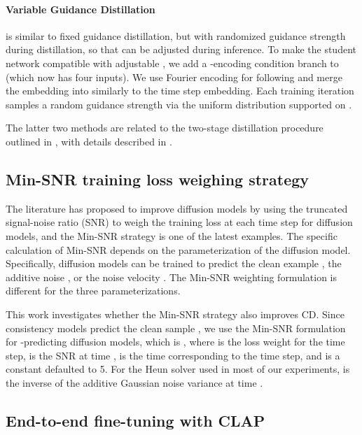 \documentclass{article}
\begin{document}
\vspace{-11pt}
\paragraph*{Variable Guidance Distillation} is similar to fixed guidance distillation, but with randomized guidance strength  during distillation, so that  can be adjusted during inference. To make the student network compatible with adjustable , we add a -encoding condition branch to  (which now has four inputs). We use Fourier encoding for  following \cite{distillcfg} and merge the embedding into  similarly to the time step embedding. Each training iteration samples a random guidance strength  via the uniform distribution supported on .

The latter two methods are related to the two-stage distillation procedure outlined in \cite{distillcfg}, with details described in .


\subsection{Min-SNR training loss weighing strategy}

The literature has proposed to improve diffusion models by using the truncated signal-noise ratio (SNR) to weigh the training loss at each time step  for diffusion models, and the Min-SNR strategy \cite{minsnr} is one of the latest examples. The specific calculation of Min-SNR depends on the parameterization of the diffusion model. Specifically, diffusion models can be trained to predict the clean example , the additive noise , or the noise velocity . The Min-SNR weighting formulation is different for the three parameterizations.

This work investigates whether the Min-SNR strategy also improves CD. Since consistency models predict the clean sample , we use the Min-SNR formulation for -predicting diffusion models, which is , where  is the loss weight for the  time step,  is the SNR at time ,  is the time corresponding to the  time step, and  is a constant defaulted to 5. For the Heun solver used in most of our experiments,  is the inverse of the additive Gaussian noise variance at time .


\subsection{End-to-end fine-tuning with CLAP} \label{sec:CLAP_finetune}
\end{document}
